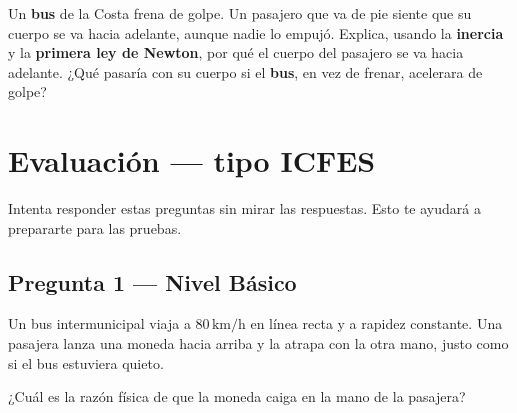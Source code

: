 \documentclass[
  spanish,
  letterpaper,
  12pt,
  oneside,
  open=any,
  DIV=15]{scrbook}
\newcommand{\setcolorsection}[2]{%
  \definecolor{currentsectionbg}{HTML}{#1}%
  \definecolor{currentsectionborder}{HTML}{#2}%
}
\begin{document}
Un \textcolor[HTML]{7C3AED}{\textbf{bus}} de la Costa frena de golpe. Un
pasajero que va de pie siente que su cuerpo se va hacia adelante, aunque
nadie lo empujó. Explica, usando la \textbf{inercia} y la
\textbf{primera ley de Newton}, por qué el cuerpo del pasajero se va
hacia adelante. ¿Qué pasaría con su cuerpo si el
\textcolor[HTML]{7C3AED}{\textbf{bus}}, en vez de frenar, acelerara de
golpe?

\setcolorsection{f0c4b8}{dcb0a4}

\section{Evaluación --- tipo ICFES}\label{evaluaciuxf3n-tipo-icfes-6}

\begin{tcolorbox}[enhanced jigsaw, arc=.35mm, bottomrule=.15mm, bottomtitle=1mm, breakable, colback=white, colbacktitle=quarto-callout-warning-color!10!white, colframe=quarto-callout-warning-color-frame, coltitle=black, left=2mm, leftrule=.75mm, opacityback=0, opacitybacktitle=0.6, rightrule=.15mm, title=\textcolor{quarto-callout-warning-color}{\faExclamationTriangle}\hspace{0.5em}{Autoevaluación}, titlerule=0mm, toprule=.15mm, toptitle=1mm]

Intenta responder estas preguntas sin mirar las respuestas. Esto te
ayudará a prepararte para las pruebas.

\subsection{Pregunta 1 --- Nivel
Básico}\label{pregunta-1-nivel-buxe1sico-6}

Un bus intermunicipal viaja a \(80\,\text{km/h}\) en línea recta y a
rapidez constante. Una pasajera lanza una moneda hacia arriba y la
atrapa con la otra mano, justo como si el bus estuviera quieto.

¿Cuál es la razón física de que la moneda caiga en la mano de la
pasajera?


\end{tcolorbox}
\end{document}
